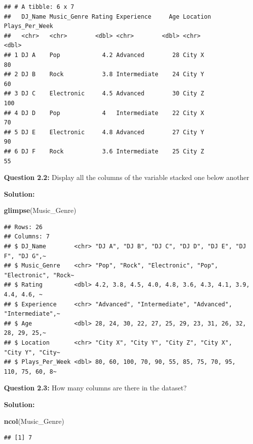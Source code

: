 \documentclass[
]{article}
\newenvironment{Shaded}{\begin{snugshade}}{\end{snugshade}}
\newcommand{\FunctionTok}[1]{\textcolor[rgb]{0.13,0.29,0.53}{\textbf{#1}}}
\newcommand{\NormalTok}[1]{#1}
\begin{document}
\begin{verbatim}
## # A tibble: 6 x 7
##   DJ_Name Music_Genre Rating Experience     Age Location Plays_Per_Week
##   <chr>   <chr>        <dbl> <chr>        <dbl> <chr>             <dbl>
## 1 DJ A    Pop            4.2 Advanced        28 City X               80
## 2 DJ B    Rock           3.8 Intermediate    24 City Y               60
## 3 DJ C    Electronic     4.5 Advanced        30 City Z              100
## 4 DJ D    Pop            4   Intermediate    22 City X               70
## 5 DJ E    Electronic     4.8 Advanced        27 City Y               90
## 6 DJ F    Rock           3.6 Intermediate    25 City Z               55
\end{verbatim}

\textbf{Question 2.2:} Display all the columns of the variable stacked
one below another

\textbf{Solution:}

\begin{Shaded}
\begin{Highlighting}[]
\FunctionTok{glimpse}\NormalTok{(Music\_Genre)}
\end{Highlighting}
\end{Shaded}

\begin{verbatim}
## Rows: 26
## Columns: 7
## $ DJ_Name        <chr> "DJ A", "DJ B", "DJ C", "DJ D", "DJ E", "DJ F", "DJ G",~
## $ Music_Genre    <chr> "Pop", "Rock", "Electronic", "Pop", "Electronic", "Rock~
## $ Rating         <dbl> 4.2, 3.8, 4.5, 4.0, 4.8, 3.6, 4.3, 4.1, 3.9, 4.4, 4.6, ~
## $ Experience     <chr> "Advanced", "Intermediate", "Advanced", "Intermediate",~
## $ Age            <dbl> 28, 24, 30, 22, 27, 25, 29, 23, 31, 26, 32, 28, 29, 25,~
## $ Location       <chr> "City X", "City Y", "City Z", "City X", "City Y", "City~
## $ Plays_Per_Week <dbl> 80, 60, 100, 70, 90, 55, 85, 75, 70, 95, 110, 75, 60, 8~
\end{verbatim}

\textbf{Question 2.3:} How many columns are there in the dataset?

\textbf{Solution:}

\begin{Shaded}
\begin{Highlighting}[]
\FunctionTok{ncol}\NormalTok{(Music\_Genre)}
\end{Highlighting}
\end{Shaded}

\begin{verbatim}
## [1] 7
\end{verbatim}
\end{document}
